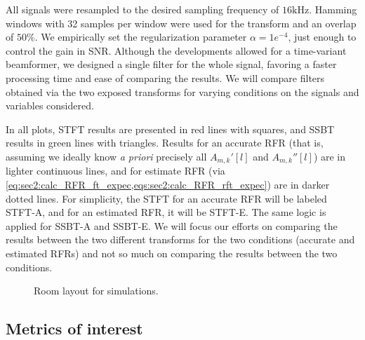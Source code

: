 All signals were resampled to the desired sampling frequency of $16\si{\kilo\hertz}$. Hamming windows with 32 samples per window were used for the transform and an overlap of $50\%$. We empirically set the regularization parameter $\alpha = 1e^{-4}$, just enough to control the gain in SNR. Although the developments allowed for a time-variant beamformer, we designed a single filter for the whole signal, favoring a faster processing time and ease of comparing the results. We will compare filters obtained via the two exposed transforms for varying conditions on the signals and variables considered.

In all plots, STFT results are presented in red lines with squares, and SSBT results in green lines with triangles. Results for an accurate RFR (that is, assuming we ideally know \textit{a priori} precisely all $A_{m,k}'[l]$ and $A_{m,k}''[l]$) are in lighter continuous lines, and for estimate RFR (via \cref{eq:sec2:calc_RFR_ft_expec,eqs:sec2:calc_RFR_rft_expec}) are in darker dotted lines. For simplicity, the STFT for an accurate RFR will be labeled STFT-A, and for an estimated RFR, it will be STFT-E. The same logic is applied for SSBT-A and SSBT-E. We will focus our efforts on comparing the results between the two different transforms for the two conditions (accurate and estimated RFRs) and not so much on comparing the results between the two conditions.

\begin{figure}[!t]
	\centering
	
	\caption{Room layout for simulations.}
	\label{fig:room_layout}
\end{figure}
%

\subsection{Metrics of interest}

